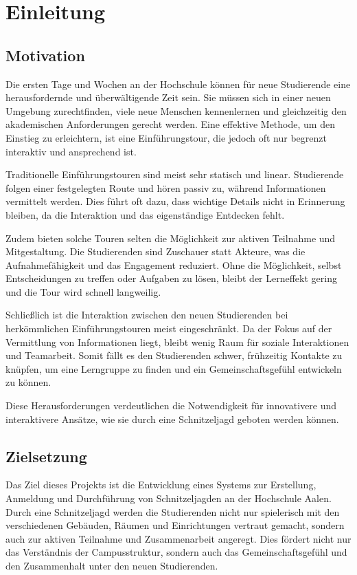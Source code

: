 \chapter{Einleitung} \label{cha:einleitung}

\section{Motivation}

Die ersten Tage und Wochen an der Hochschule können für neue Studierende eine herausfordernde und überwältigende Zeit sein. Sie müssen sich in einer neuen Umgebung zurechtfinden, viele neue Menschen kennenlernen und gleichzeitig den akademischen Anforderungen gerecht werden. Eine effektive Methode, um den Einstieg zu erleichtern, ist eine Einführungstour, die jedoch oft nur begrenzt interaktiv und ansprechend ist.

Traditionelle Einführungstouren sind meist sehr statisch und linear. Studierende folgen einer festgelegten Route und hören passiv zu, während Informationen vermittelt werden. Dies führt oft dazu, dass wichtige Details nicht in Erinnerung bleiben, da die Interaktion und das eigenständige Entdecken fehlt.

Zudem bieten solche Touren selten die Möglichkeit zur aktiven Teilnahme und Mitgestaltung. Die Studierenden sind Zuschauer statt Akteure, was die Aufnahmefähigkeit und das Engagement reduziert. Ohne die Möglichkeit, selbst Entscheidungen zu treffen oder Aufgaben zu lösen, bleibt der Lerneffekt gering und die Tour wird schnell langweilig.

Schließlich ist die Interaktion zwischen den neuen Studierenden bei herkömmlichen Einführungstouren meist eingeschränkt. Da der Fokus auf der Vermittlung von Informationen liegt, bleibt wenig Raum für soziale Interaktionen und Teamarbeit. Somit fällt es den Studierenden schwer, frühzeitig Kontakte zu knüpfen, um eine Lerngruppe zu finden und ein Gemeinschaftsgefühl entwickeln zu können.

Diese Herausforderungen verdeutlichen die Notwendigkeit für innovativere und interaktivere Ansätze, wie sie durch eine Schnitzeljagd geboten werden können.

\section{Zielsetzung}

Das Ziel dieses Projekts ist die Entwicklung eines Systems zur Erstellung, Anmeldung und Durchführung von Schnitzeljagden an der Hochschule Aalen. Durch eine Schnitzeljagd werden die Studierenden nicht nur spielerisch mit den verschiedenen Gebäuden, Räumen und Einrichtungen vertraut gemacht, sondern auch zur aktiven Teilnahme und Zusammenarbeit angeregt. Dies fördert nicht nur das Verständnis der Campusstruktur, sondern auch das Gemeinschaftsgefühl und den Zusammenhalt unter den neuen Studierenden.

